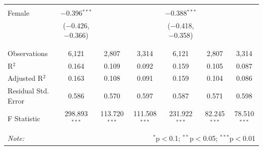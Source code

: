 \documentclass[12pt,a4paper]{article}
\numberwithin{equation}{section}
\begin{document}
\begin{landscape}
\begin{table}[!htbp]
\begin{tabular}{@{\extracolsep{5pt}}lcccccc}
			& & & & & & \\ 
			Female & $-$0.396$^{***}$ &  &  & $-$0.388$^{***}$ &  &  \\ 
			& ($-$0.426, $-$0.366) &  &  & ($-$0.418, $-$0.358) &  &  \\ 
			& & & & & & \\ 
			\hline \\[-1.8ex] 
			Observations & 6,121 & 2,807 & 3,314 & 6,121 & 2,807 & 3,314 \\ 
			R$^{2}$ & 0.164 & 0.109 & 0.092 & 0.159 & 0.105 & 0.087 \\ 
			Adjusted R$^{2}$ & 0.163 & 0.108 & 0.091 & 0.159 & 0.104 & 0.086 \\ 
			Residual Std. Error & 0.586 & 0.570 & 0.597 & 0.587 & 0.571 & 0.598 \\ 
			F Statistic & 298.893$^{***}$ & 113.720$^{***}$ & 111.508$^{***}$ & 231.922$^{***}$ & 82.245$^{***}$ & 78.510$^{***}$ \\ 
			\hline 
			\hline \\[-1.8ex] 
			\textit{Note:}  & \multicolumn{6}{r}{$^{*}$p$<$0.1; $^{**}$p$<$0.05; $^{***}$p$<$0.01} \\ 
		\end{tabular} 
	\end{table} 
	
\end{landscape}

\newpage
\end{document}
